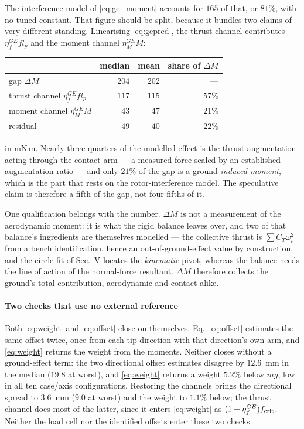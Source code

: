 \documentclass[10pt]{article}
\begin{document}
The interference model of \eqref{eq:ge_moment} accounts for $165$ of
that, or $81\%$, with no tuned constant. That figure should be split,
because it bundles two claims of very different standing. Linearising
\eqref{eq:gepred}, the thrust channel contributes $\eta_f^{GE}fl_p$ and
the moment channel $\eta_M^{GE}M$:
\begin{center}\small
\begin{tabular}{@{}lrrr@{}}
\hline
 & median & mean & share of $\Delta M$ \\
\hline
gap $\Delta M$                           & $204$ & $202$ & --- \\
thrust channel $\eta_f^{GE}fl_p$         & $117$ & $115$ & $57\%$ \\
moment channel $\eta_M^{GE}M$            & $43$  & $47$  & $21\%$ \\
residual                                 & $49$  & $40$  & $22\%$ \\
\hline
\end{tabular}
\end{center}
in mN\,m. Nearly three-quarters of the modelled effect is the thrust
augmentation acting through the contact arm --- a measured force scaled
by an established augmentation ratio --- and only $21\%$ of the gap is
a ground-\emph{induced moment}, which is the part that rests on the
rotor-interference model. The speculative claim is therefore a fifth of
the gap, not four-fifths of it.

One qualification belongs with the number. $\Delta M$ is not a
measurement of the aerodynamic moment: it is what the rigid balance
leaves over, and two of that balance's ingredients are themselves
modelled --- the collective thrust is $\sum C_T\omega_i^2$ from a bench
identification, hence an out-of-ground-effect value by construction,
and the circle fit of Sec.~V locates the \emph{kinematic} pivot,
whereas the balance needs the line of action of the normal-force
resultant. $\Delta M$ therefore collects the ground's total
contribution, aerodynamic and contact alike.

\paragraph{Two checks that use no external reference}
Both \eqref{eq:weight} and \eqref{eq:offset} close on themselves.
Eq.~\eqref{eq:offset} estimates the same offset twice, once from each
tip direction with that direction's own arm, and \eqref{eq:weight}
returns the weight from the moments. Neither closes without a
ground-effect term: the two directional offset estimates disagree by
$12.6$~mm in the median ($19.8$ at worst), and \eqref{eq:weight}
returns a weight $5.2\%$ below $mg$, low in all ten case/axis
configurations. Restoring the channels brings the directional spread
to $3.6$~mm ($9.0$ at worst) and the weight to $1.1\%$ below; the
thrust channel does most of the latter, since it enters
\eqref{eq:weight} as $(1+\eta_f^{GE})f_{\rm crit}$. Neither the load
cell nor the identified offsets enter these two checks.
\end{document}
